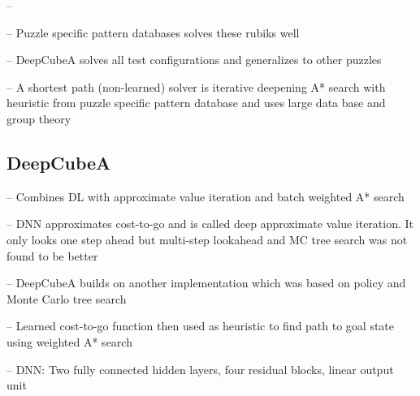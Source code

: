 \documentclass[../main.tex]{subfiles}
\begin{document}
--



\cite{SolvingNature}
-- Puzzle specific pattern databases solves these rubiks well


-- DeepCubeA solves all test configurations and generalizes to other puzzles

-- A shortest path (non-learned) solver is iterative deepening A* search with heuristic from puzzle specific pattern database and uses large data base and group theory 

\subsection{DeepCubeA}
\cite{SolvingNature}
-- Combines DL with approximate value iteration and batch weighted A* search

-- DNN approximates cost-to-go and is called deep approximate value iteration. It only looks one step ahead but multi-step lookahead  and MC tree search was not found to be better

-- DeepCubeA builds on another implementation which was based on policy and Monte Carlo tree search 

-- Learned cost-to-go function then used as heuristic to find path to goal state using weighted A* search

-- DNN: Two fully connected hidden layers, four residual blocks, linear output unit
\end{document}
